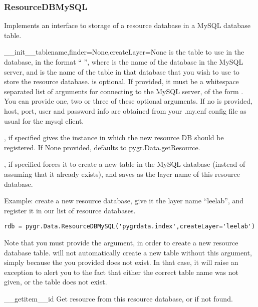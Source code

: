\documentclass{howto}
\begin{document}
\subsubsection{ResourceDBMySQL}
Implements an interface to storage of a resource database in a MySQL
database table.
\begin{funcdesc}{__init__}{tablename,finder=None,createLayer=None}
   is the table to use in the database, in the format
  `` '', where  is the name of the
  database in the MySQL server, and  is the name of
  the table in that database that you wish to use to store the
  resource database.   is optional.
  If provided, it must be a whitespace separated 
  list of arguments for connecting to the MySQL server, of the form
    .  You can provide one, two
  or three of these optional arguments.
  If no  is provided, host, port, user and password info are obtained
  from your .my.cnf config file as usual for the mysql client.

  , if specified gives the  instance
  in which the new resource DB should be registered.  If None provided,
  defaults to pygr.Data.getResource.

  , if specified forces it to create a new table
  in the MySQL database (instead of assuming that it already exists),
  and saves  as the layer name of this resource database.

  Example: create a new resource database, give it the layer name ``leelab'',
  and register it in our list of resource databases.
\begin{verbatim}
rdb = pygr.Data.ResourceDBMySQL('pygrdata.index',createLayer='leelab')
\end{verbatim}
  Note that you must provide the  argument, in order to 
  create a new resource database table.   will not
  automatically create a new table without this argument, simply because the
   you provided does not exist.  In that case, it will
  raise an exception to alert you to the fact that either the correct table name
  was not given, or the table does not exist.
\end{funcdesc}

\begin{funcdesc}{__getitem__}{id}
  Get resource  from this resource database, or  
  if not found.
\end{funcdesc}
\end{document}
